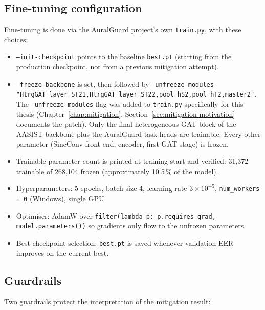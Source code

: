 \subsection{Fine-tuning configuration}
\label{sec:methodology-mitigation-config}

Fine-tuning is done via the AuralGuard project's own
\texttt{train.py}, with these choices:

\begin{itemize}
    \item \texttt{--init-checkpoint} points to the baseline \texttt{best.pt} (starting
        from the production checkpoint, not from a previous mitigation
        attempt).
    \item \texttt{--freeze-backbone} is set, then followed by
        \texttt{--unfreeze-modules}\allowbreak{} \texttt{"HtrgGAT\_layer\_ST21,}\allowbreak\texttt{HtrgGAT\_layer\_ST22,}\allowbreak\texttt{pool\_hS2,pool\_hT2,master2"}.
        The \texttt{--unfreeze-modules} flag was added to \texttt{train.py} specifically
        for this thesis (Chapter~\ref{chap:mitigation}, Section~\ref{sec:mitigation-motivation} documents the patch).
        Only the final heterogeneous-GAT block of the AASIST backbone
        plus the AuralGuard task heads are trainable. Every other
        parameter (SincConv front-end, encoder, first-GAT stage) is
        frozen.
    \item Trainable-parameter count is printed at training start and
        verified: 31,372 trainable of 268,104 frozen (approximately 10.5\,\%
        of the model).
    \item Hyperparameters: 5 epochs, batch size 4, learning rate $3 \times 10^{-5}$,
        \texttt{num\_workers = 0} (Windows), single GPU.
    \item Optimiser: AdamW over \texttt{filter(lambda p: p.requires\_grad, model.parameters())}
        so gradients only flow to the unfrozen parameters.
    \item Best-checkpoint selection: \texttt{best.pt} is saved whenever validation
        EER improves on the current best.
\end{itemize}

\subsection{Guardrails}
\label{sec:methodology-mitigation-guardrails}

Two guardrails protect the interpretation of the mitigation result:

